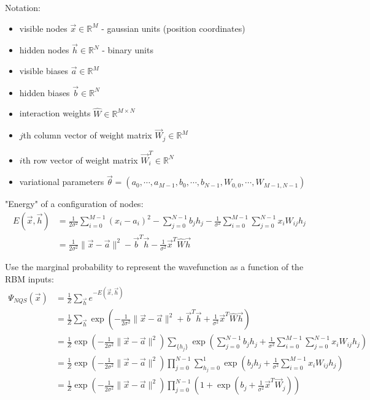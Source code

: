 \documentclass[12pt]{article}
\begin{document}
\noindent Notation:
\begin{itemize}
\item visible nodes $\vec{x}  \in \mathbb{R}^M$ - gaussian units (position coordinates)
\item hidden nodes $\vec{h} \in \mathbb{R}^N$ - binary units
\item visible biases $\vec{a} \in \mathbb{R}^M$
\item hidden biases $\vec{b} \in \mathbb{R}^N$
\item interaction weights $\hat{W} \in \mathbb{R}^{M\times N}$
\item $j$th column vector of weight matrix $\vec{W}_j \in \mathbb{R}^M$
\item $i$th row vector of weight matrix $\vec{W}_i^T \in \mathbb{R}^N$ 
\item variational parameters $\vec{\theta} = ( a_0, \cdots, a_{M-1},b_0,\cdots,b_{N-1}, W_{0,0},\cdots,W_{M-1,N-1} )$ \\
\end{itemize}

\noindent "Energy" of a configuration of nodes:
\begin{align*}
E(\vec{x},\vec{h}) &= \frac{1}{2\sigma^2} \sum_{i=0}^{M-1}(x_i - a_i)^2 - \sum_{j=0}^{N-1} b_j h_j -
\frac{1}{\sigma^2} \sum_{i=0}^{M-1}\sum_{j=0}^{N-1} x_i W_{ij} h_j\\
&= \frac{1}{2\sigma^2} \| \vec{x} - \vec{a} \|^2 - \vec{b}^T \vec{h} - \frac{1}{\sigma^2}\vec{x}^T \hat{W} \vec{h}
\end{align*}

\noindent Use the marginal probability to represent the wavefunction as a function of the RBM inputs:
\begin{align*}
\Psi_{NQS}(\vec{x}) &= \frac{1}{Z} \sum_{\vec{h}} e^{-E(\vec{x},\vec{h})}\\
&= \frac{1}{Z} \sum_{\vec{h}} \exp 
\left(
-\frac{1}{2\sigma^2} \| \vec{x} - \vec{a} \|^2 + \vec{b}^T \vec{h} + \frac{1}{\sigma^2}\vec{x}^T \hat{W} \vec{h}
 \right)\\
 &= \frac{1}{Z} \exp 
\left(
-\frac{1}{2\sigma^2} \| \vec{x} - \vec{a} \|^2
\right) \sum_{ \{ h_j \} } \exp \left( \sum_{j=0}^{N-1} b_j h_j + \frac{1}{\sigma^2} \sum_{i=0}^{M-1}\sum_{j=0}^{N-1} x_i W_{ij} h_j  \right)\\
&= \frac{1}{Z} \exp 
\left(
-\frac{1}{2\sigma^2} \| \vec{x} - \vec{a} \|^2
\right)
\prod_{j=0}^{N-1} \sum_{ h_j=0 }^1 \exp \left( b_j h_j + \frac{1}{\sigma^2} \sum_{i=0}^{M-1} x_i W_{ij} h_j  \right)\\
&= \frac{1}{Z} \exp \left( -\frac{1}{2\sigma^2} \| \vec{x}-\vec{a} \|^2 \right) \prod_{j=0}^{N-1} \left( 1 + \exp \left( b_j + \frac{1}{\sigma^2} \vec{x}^T \vec{W}_j \right) \right)
\end{align*}
\end{document}
